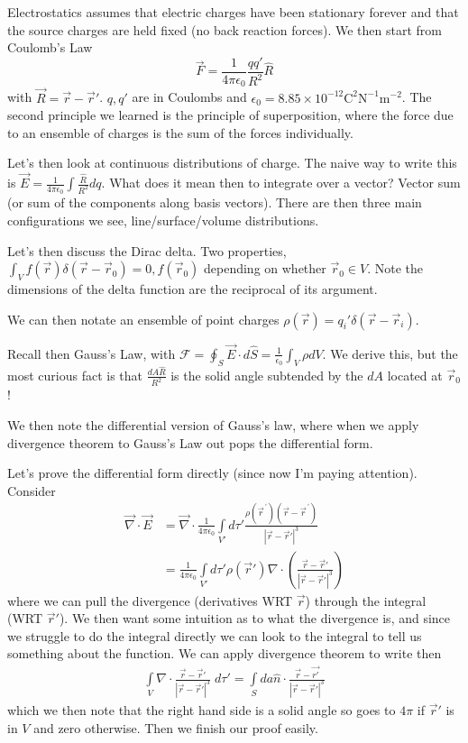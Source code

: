 \documentclass[10pt]{report}
\newcommand{\scinot}[2]{#1\times 10^{#2}}
\newcommand{\pvec}[1]{\vec{#1}^{\,\prime}}
\newcommand{\abs}[1]{\left|#1\right|}
\begin{document}
Electrostatics assumes that electric charges have been stationary forever and that the source charges are held fixed (no back reaction forces). We then start from Coulomb's Law
\begin{equation}
    \vec{F} = \frac{1}{4\pi \epsilon_0}\frac{qq'}{R^2}\hat{R}
\end{equation}
with $\vec{R} = \vec{r} - \vec{r}'$. $q,q'$ are in Coulombs and $\epsilon_0 = \scinot{8.85}{-12}\mathrm{C^2N^{-1}m^{-2}}$. The second principle we learned is the principle of superposition, where the force due to an ensemble of charges is the sum of the forces individually. 

Let's then look at continuous distributions of charge. The naive way to write this is $\vec{E} = \frac{1}{4\pi \epsilon_0}\int \frac{\hat{R}}{R^2}dq$. What does it mean then to integrate over a vector? Vector sum (or sum of the components along basis vectors). There are then three main configurations we see, line/surface/volume distributions. 

Let's then discuss the Dirac delta. Two properties, $\int_V f(\vec{r}) \delta(\vec{r} - \vec{r}_0) = 0, f(\vec{r}_0)$ depending on whether $\vec{r}_0 \in V$. Note the dimensions of the delta function are the reciprocal of its argument.

We can then notate an ensemble of point charges $\rho(\vec{r}) = q_i' \delta(\vec{r} - \vec{r}_i)$. 

Recall then Gauss's Law, with $\mathcal{F} = \oint_S\vec{E}\cdot d\hat{S} = \frac{1}{\epsilon_0}\int_V \rho dV$. We derive this, but the most curious fact is that $\frac{dA\hat{R}}{R^2}$ is the solid angle subtended by the $dA$ located at $\vec{r}_0$! 

We then note the differential version of Gauss's law, where when we apply divergence theorem to Gauss's Law out pops the differential form.

Let's prove the differential form directly (since now I'm paying attention). Consider
\begin{align}
    \vec{\nabla}\cdot \vec{E} &= \vec{\nabla}\cdot \frac{1}{4\pi \epsilon_0}\displaystyle\int\limits_{V'}^{}d\tau'\frac{\rho(\pvec{r})(\vec{r} - \pvec{r})}{\abs{\vec{r} - \vec{r}'}^3}\\
    &= \frac{1}{4\pi \epsilon_0}\displaystyle\int\limits_{V'}^{}d\tau' \rho(\vec{r}') \nabla \cdot \left( \frac{\vec{r} - \vec{r}'}{\abs{\vec{r} - \vec{r}'}^3} \right)
\end{align}
where we can pull the divergence (derivatives WRT $\vec{r}$) through the integral (WRT $\vec{r}'$). We then want some intuition as to what the divergence is, and since we struggle to do the integral directly we can look to the integral to tell us something about the function. We can apply divergence theorem to write then
\begin{align}
    \displaystyle\int\limits_{V}^{}\nabla \cdot \frac{\vec{r} - \vec{r}'}{\abs{\vec{r} - \vec{r}'}^3}\;d\tau' = \displaystyle\int\limits_{S}^{}da\hat{n}\cdot \frac{\vec{r} - \vec{r'}}{\abs{\vec{r} - \vec{r}'}^3}
\end{align}
which we then note that the right hand side is a solid angle so goes to $4\pi$ if $\vec{r}'$ is in $V$ and zero otherwise. Then we finish our proof easily.
\end{document}
